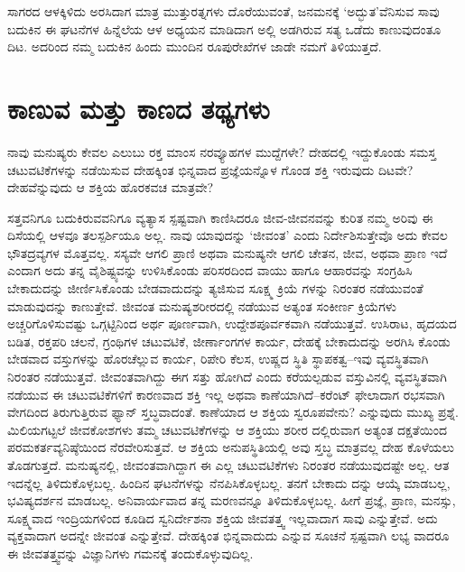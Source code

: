 ಸಾಗರದ ಆಳಕ್ಕಿಳಿದು ಅರಸಿದಾಗ ಮಾತ್ರ ಮುತ್ತುರತ್ನಗಳು ದೊರೆಯುವಂತೆ, ಜನಮನಕ್ಕೆ ‘ಅದ್ಭುತ’ವೆನಿಸುವ ಸಾವು ಬದುಕಿನ ಈ ಘಟನೆಗಳ ಹಿನ್ನೆಲೆಯ ಆಳ ಅಧ್ಯಯನ ಮಾಡಿದಾಗ ಅಲ್ಲಿ ಅಡಗಿರುವ ಸತ್ಯ ಒಡೆದು ಕಾಣುವುದಂತೂ ದಿಟ. ಅದರಿಂದ ನಮ್ಮ ಬದುಕಿನ ಹಿಂದು ಮುಂದಿನ ರೂಪುರೇಖೆಗಳ ಜಾಡೇ ನಮಗೆ ತಿಳಿಯುತ್ತದೆ.


\section{ಕಾಣುವ ಮತ್ತು ಕಾಣದ ತಥ್ಯಗಳು}

ನಾವು ಮನುಷ್ಯರು ಕೇವಲ ಎಲುಬು ರಕ್ತ ಮಾಂಸ ನರವ್ಯೂಹಗಳ ಮುದ್ದೆಗಳೇ? ದೇಹದಲ್ಲಿ ಇದ್ದುಕೊಂಡು ಸಮಸ್ತ ಚಟುವಟಿಕೆಗಳನ್ನು ನಡೆಯಿಸುವ ದೇಹಕ್ಕಿಂತ ಭಿನ್ನವಾದ ಪ್ರಜ್ಞೆಯನ್ನೊಳ ಗೊಂಡ ಶಕ್ತಿ ಇರುವುದು ದಿಟವೇ? ದೇಹವೆನ್ನುವುದು ಆ ಶಕ್ತಿಯ ಹೊರಕವಚ ಮಾತ್ರವೇ?

ಸತ್ತವನಿಗೂ ಬದುಕಿರುವವನಿಗೂ ವ್ಯತ್ಯಾಸ ಸ್ಪಷ್ಟವಾಗಿ ಕಾಣಿಸಿದರೂ ಜೀವ-ಜೀವನವನ್ನು ಕುರಿತ ನಮ್ಮ ಅರಿವು ಈ ದಿಸೆಯಲ್ಲಿ ಆಳವೂ ತಲಸ್ಪರ್ಶಿಯೂ ಅಲ್ಲ. ನಾವು ಯಾವುದನ್ನು ‘ಜೀವಂತ’ ಎಂದು ನಿರ್ದೇಶಿಸುತ್ತೇವೊ ಅದು ಕೇವಲ ಭೌತದ್ರವ್ಯಗಳ ಮೊತ್ತವಲ್ಲ. ಸಸ್ಯವೇ ಆಗಲಿ ಪ್ರಾಣಿ ಅಥವಾ ಮನುಷ್ಯನೇ ಆಗಲಿ ಚೇತನ, ಜೀವ, ಅಥವಾ ಪ್ರಾಣ ಇದೆ ಎಂದಾಗ ಅದು ತನ್ನ ವೈಶಿಷ್ಟ್ಯವನ್ನು ಉಳಿಸಿಕೊಂಡು ಪರಿಸರದಿಂದ ವಾಯು ಹಾಗೂ ಆಹಾರವನ್ನು ಸಂಗ್ರಹಿಸಿ ಬೇಕಾದುದನ್ನು ಜೀರ್ಣಿಸಿಕೊಂಡು ಬೇಡವಾದುದನ್ನು ತ್ಯಜಿಸುವ ಸೂಕ್ಷ್ಮ ಕ್ರಿಯೆ ಗಳನ್ನು ನಿರಂತರ ನಡೆಯುವಂತೆ ಮಾಡುವುದನ್ನು ಕಾಣುತ್ತೇವೆ. ಜೀವಂತ ಮನುಷ್ಯಶರೀರದಲ್ಲಿ ನಡೆಯುವ ಅತ್ಯಂತ ಸಂಕೀರ್ಣ ಕ್ರಿಯೆಗಳು ಅಚ್ಚರಿಗೊಳಿಸುವಷ್ಟು ಒಗ್ಗಟ್ಟಿನಿಂದ ಅರ್ಥ ಪೂರ್ಣವಾಗಿ, ಉದ್ದೇಶಪೂರ್ವಕವಾಗಿ ನಡೆಯುತ್ತವೆ. ಉಸಿರಾಟ, ಹೃದಯದ ಬಡಿತ, ರಕ್ತಪರಿ ಚಲನೆ, ಗ್ರಂಥಿಗಳ ಚಟುವಟಿಕೆ, ಜೀರ್ಣಾಂಗಗಳ ಕಾರ್ಯ, ದೇಹಕ್ಕೆ ಬೇಕಾದುದನ್ನು ಅರಗಿಸಿ ಕೊಂಡು ಬೇಡವಾದ ವಸ್ತುಗಳನ್ನು ಹೊರಚೆಲ್ಲುವ ಕಾರ್ಯ, ರಿಪೇರಿ ಕೆಲಸ, ಉಷ್ಣದ ಸ್ಥಿತಿ ಸ್ಥಾಪಕತ್ವ–ಇವು ವ್ಯವಸ್ಥಿತವಾಗಿ ನಿರಂತರ ನಡೆಯುತ್ತವೆ. ಜೀವಂತವಾಗಿದ್ದು ಈಗ ಸತ್ತು ಹೋಗಿದೆ ಎಂದು ಕರೆಯಲ್ಪಡುವ ವಸ್ತುವಿನಲ್ಲಿ ವ್ಯವಸ್ಥಿತವಾಗಿ ನಡೆಯುವ ಈ ಚಟುವಟಿಕೆಗಳಿಗೆ ಕಾರಣವಾದ ಶಕ್ತಿ ಇಲ್ಲ ಅಥವಾ ಕಾಣೆಯಾಗಿದೆ–ಕರೆಂಟ್ ಫೇಲಾದಾಗ ರಭಸವಾಗಿ ವೇಗದಿಂದ ತಿರುಗುತ್ತಿರುವ ಫ್ಯಾನ್ ಸ್ತಬ್ಧವಾದಂತೆ. ಕಾಣೆಯಾದ ಆ ಶಕ್ತಿಯ ಸ್ವರೂಪವೇನು? ಎನ್ನುವುದು ಮುಖ್ಯ ಪ್ರಶ್ನೆ. ಮಿಲಿಯಗಟ್ಟಲೆ ಜೀವಕೋಶಗಳು ತಮ್ಮ ಚಟುವಟಿಕೆಗಳನ್ನು ಆ ಶಕ್ತಿಯು ಶರೀರ ದಲ್ಲಿರುವಾಗ ಅತ್ಯಂತ ದಕ್ಷತೆಯಿಂದ ಪರಮಕರ್ತವ್ಯನಿಷ್ಠೆಯಿಂದ ನೆರವೇರಿಸುತ್ತವೆ. ಆ ಶಕ್ತಿಯ ಅನುಪಸ್ಥಿತಿಯಲ್ಲಿ ಅವು ಸ್ತಬ್ಧ ಮಾತ್ರವಲ್ಲ ದೇಹ ಕೊಳೆಯಲು ತೊಡಗುತ್ತದೆ. ಮನುಷ್ಯನಲ್ಲಿ, ಜೀವಂತವಾಗಿದ್ದಾಗ ಈ ಎಲ್ಲ ಚಟುವಟಿಕೆಗಳು ನಿರಂತರ ನಡೆಯುವುದಷ್ಟೇ ಅಲ್ಲ. ಆತ ಇದನ್ನೆಲ್ಲ ತಿಳಿದುಕೊಳ್ಳಬಲ್ಲ. ಹಿಂದಿನ ಘಟನೆಗಳನ್ನು ನೆನಪಿಸಿಕೊಳ್ಳಬಲ್ಲ. ತನಗೆ ಬೇಕಾದು ದನ್ನು ಆಯ್ಕೆ ಮಾಡಬಲ್ಲ, ಭವಿಷ್ಯದರ್ಶನ ಮಾಡಬಲ್ಲ. ಅನಿವಾರ್ಯವಾದ ತನ್ನ ಮರಣವನ್ನೂ ತಿಳಿದುಕೊಳ್ಳಬಲ್ಲ. ಹೀಗೆ ಪ್ರಜ್ಞೆ, ಪ್ರಾಣ, ಮನಸ್ಸು, ಸೂಕ್ಷ್ಮವಾದ ಇಂದ್ರಿಯಗಳಿಂದ ಕೂಡಿದ ಸ್ವನಿರ್ದೇಶನಾ ಶಕ್ತಿಯ ಜೀವತತ್ತ್ವ ಇಲ್ಲವಾದಾಗ ಸಾವು ಎನ್ನುತ್ತೇವೆ. ಅದು ವ್ಯಕ್ತವಾದಾಗ ಅದನ್ನೇ ಜೀವಂತ ಎನ್ನುತ್ತೇವೆ. ದೇಹಕ್ಕಿಂತ ಭಿನ್ನವಾದುದು ಎನ್ನುವ ಸೂಚನೆ ಸ್ಪಷ್ಟವಾಗಿ ಲಭ್ಯ ವಾದರೂ ಈ ಜೀವತತ್ತ್ವವನ್ನು ವಿಜ್ಞಾನಿಗಳು ಗಮನಕ್ಕೆ ತಂದುಕೊಳ್ಳುವುದಿಲ್ಲ.

